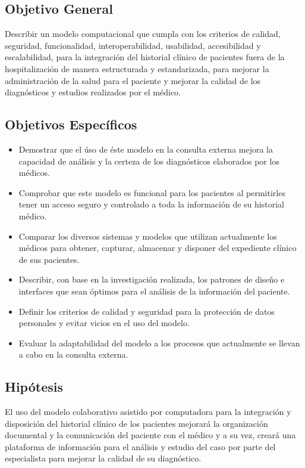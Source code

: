     \subsection{Objetivo General}    
    Describir un modelo computacional que cumpla con los criterios de calidad, seguridad, funcionalidad, interoperabilidad, usabilidad, accesibilidad y escalabilidad, para la integración del historial clínico de pacientes fuera de la hospitalización de manera estructurada y estandarizada, para mejorar la administración de la salud para el paciente y mejorar la calidad de los diagnósticos y estudios realizados por el médico.
    \subsection{Objetivos Específicos}
    \begin{itemize}
        \item Demostrar que el úso de éste modelo en la consulta externa mejora la capacidad de análisis y la certeza de los diagnósticos elaborados por los médicos.
        
        \item Comprobar que este modelo es funcional para los pacientes al permitirles tener un acceso seguro y controlado a toda la información de su historial médico.
        
        \item Comparar los diversos sistemas y modelos que utilizan actualmente los médicos para obtener, capturar, almacenar y disponer del expediente clínico de sus pacientes.
        
        \item Describir, con base en la investigación realizada, los patrones de diseño e interfaces que sean óptimos para el análisis de la información del paciente.
        
        \item Definir los criterios de calidad y seguridad para la protección de datos personales y evitar vicios en el uso del modelo.
        
        \item Evaluar la adaptabilidad del modelo a los procesos que actualmente se llevan a cabo en la consulta externa.
    \end{itemize}
    \subsection{Hipótesis}
    El uso del modelo colaborativo asistido por computadora para la integración y disposición del historial clínico de los pacientes mejorará la organización documental y la comunicación del paciente con el médico y a su vez, creará una plataforma de información para el análisis y estudio del caso por parte del especialista para mejorar la calidad de su diagnóstico.
